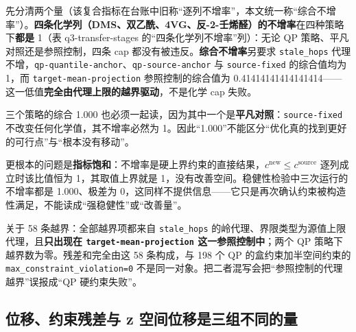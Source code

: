 \documentclass[11pt,a4paper]{article}
\begin{document}
先分清两个量（该复合指标在台账中旧称``逐列不增率''，本文统一称``综合不增率''）。\textbf{四条化学列（DMS、双乙酰、4VG、反-2-壬烯醛）的不增率}在四种策略下\textbf{都是}
1（表 q3-transfer-stages 的``四条化学列不增率''列）：无论 QP
策略、平凡对照还是参照控制，四条 cap
都没有被违反。\textbf{综合不增率}另要求 \texttt{stale\_hops}
代理不增，\texttt{qp-\allowbreak{}quantile-\allowbreak{}anchor}、\texttt{qp-\allowbreak{}source-\allowbreak{}anchor} 与
\texttt{source-fixed} 的综合值均为 1，而 \texttt{target-\allowbreak{}mean-\allowbreak{}projection}
参照控制的综合值为
0.41414141414141414------这一低值\textbf{完全由代理上限的越界驱动}，不是化学
cap 失败。

三个策略的综合 1.000
也必须一起读，因为其中一个是\textbf{平凡对照}：\texttt{source-fixed}
不改变任何化学值，其不增率必然为
1。因此``1.000''不能区分``优化真的找到更好的可行点''与``根本没有移动''。

更根本的问题是\textbf{指标饱和}：不增率是硬上界约束的直接结果，\(c^{\mathrm{new}}\le c^{\mathrm{source}}\)
逐列成立时该比值恒为 1，其取值上界就是
1，没有改善空间。稳健性检验中三次运行的不增率都是 1.000、极差为
0，这同样不提供信息------它只是再次确认约束被构造性满足，不能读成``强稳健性''或``改善量''。

关于 58 条越界：全部越界项都来自 \texttt{stale\_hops}
的岭代理、界限类型为源值上限代理，且\textbf{只出现在
\texttt{target-\allowbreak{}mean-\allowbreak{}projection} 这一参照控制中}；两个 QP
策略下越界数为零。残差和完全由这 58 条构成，与 198 个 QP
的盒约束加半空间约束的 \texttt{max\_constraint\_violation=0}
不是同一对象。把二者混写会把``参照控制的代理越界''误报成``QP
硬约束失败''。

\subsection{位移、约束残差与 z
空间位移是三组不同的量}\label{ux4f4dux79fbux7ea6ux675fux6b8bux5deeux4e0e-z-ux7a7aux95f4ux4f4dux79fbux662fux4e09ux7ec4ux4e0dux540cux7684ux91cf}
\end{document}
